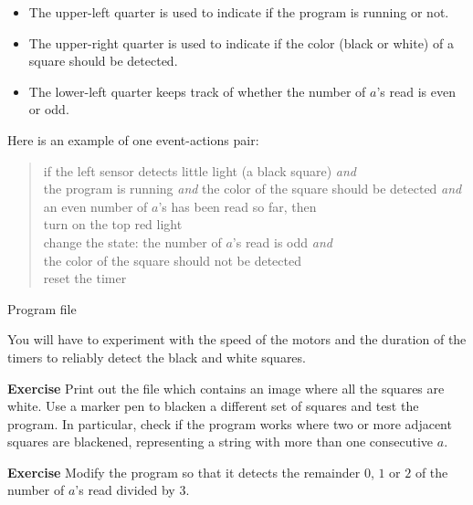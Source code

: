 \begin{itemize}
\item The upper-left quarter is used to indicate if the program is
running or not.
\item The upper-right quarter is used to indicate if the color (black or
white) of a square should be detected.
\item The lower-left quarter keeps track of whether the
number of $a$'s read is even or odd.
\end{itemize}

Here is an example of one event-actions pair:


\begin{quote}
if the left sensor detects little light (a black square) \emph{and}\\
\hspace*{1em} the program is running \emph{and}
the color of the square should be detected \emph{and}\\
\hspace*{1em} an even number of $a$'s has been read so far, then\\
\hspace*{2em} turn on the top red light\\
\hspace*{2em} change the state: the number of $a$'s
read is odd \emph{and}\\
\hspace*{4em} the color of the square should not be detected\\
\hspace*{2em} reset the timer
\end{quote}

{\raggedleft \hfill Program file }

You will have to experiment with the speed of the motors and the
duration of the timers to reliably detect the black and white squares.

\textbf{Exercise} Print out the file  which
contains an image where all the squares are white. Use a marker pen to
blacken a different set of squares and test the program. In particular,
check if the program works where two or more adjacent squares are
blackened, representing a string with more than one consecutive $a$.

\textbf{Exercise} Modify the program so that it detects the remainder
$0$, $1$ or $2$ of the number of $a$'s read divided by $3$.

